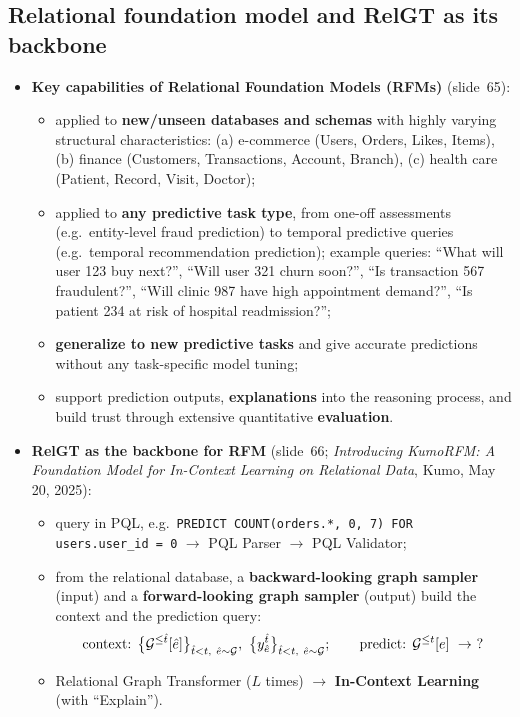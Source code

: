 \subsection{Relational foundation model and RelGT as its backbone}\label{sec:lec13-kumorfm}

\begin{itemize}
  \item \textbf{Key capabilities of Relational Foundation Models (RFMs)} (slide~65):
    \begin{itemize}
      \item applied to \textbf{new/unseen databases and schemas} with highly varying
        structural characteristics: (a) e-commerce (Users, Orders, Likes, Items), (b)
        finance (Customers, Transactions, Account, Branch), (c) health care (Patient,
        Record, Visit, Doctor);
      \item applied to \textbf{any predictive task type}, from one-off assessments
        (e.g.\ entity-level fraud prediction) to temporal predictive queries (e.g.\
        temporal recommendation prediction); example queries: ``What will user 123 buy
        next?'', ``Will user 321 churn soon?'', ``Is transaction 567 fraudulent?'',
        ``Will clinic 987 have high appointment demand?'', ``Is patient 234 at risk of
        hospital readmission?'';
      \item \textbf{generalize to new predictive tasks} and give accurate predictions
        without any task-specific model tuning;
      \item support prediction outputs, \textbf{explanations} into the reasoning
        process, and build trust through extensive quantitative \textbf{evaluation}.
    \end{itemize}
  \item \textbf{RelGT as the backbone for RFM} (slide~66; \emph{Introducing KumoRFM: A
    Foundation Model for In-Context Learning on Relational Data}, Kumo, May 20, 2025):
    \begin{itemize}
      \item query in PQL, e.g.\ \texttt{PREDICT COUNT(orders.*, 0, 7) FOR users.user\_id
        = 0} $\to$ PQL Parser $\to$ PQL Validator;
      \item from the relational database, a \textbf{backward-looking graph sampler}
        (input) and a \textbf{forward-looking graph sampler} (output) build the context
        and the prediction query:
        \begin{equation}\label{eq:lec13-icl}
          \text{context: }\big\{\mathcal{G}^{\le\hat t}[\hat e]\big\}_{\hat t<t,\ \hat e\sim\mathcal{G}},
          \ \big\{y^{\hat t}_{\hat e}\big\}_{\hat t<t,\ \hat e\sim\mathcal{G}};
          \qquad
          \text{predict: }\mathcal{G}^{\le t}[e]\ \to\ ?
        \end{equation}
      \item Relational Graph Transformer ($L$ times) $\to$ \textbf{In-Context Learning}
        (with ``Explain'').
    \end{itemize}
\end{itemize}
